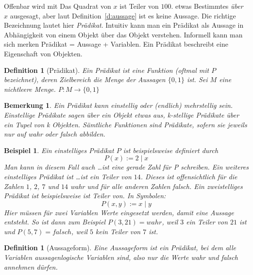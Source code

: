 \documentclass[a4paper]{article}
\newtheorem{beispiel}[satz]{Beispiel}
\newtheorem{bemerkung}[satz]{Bemerkung}
\newtheorem{definition}[satz]{Definition} %
\theoremstyle{nonumberplain}
\begin{document}
Offenbar wird mit \glqq Das Quadrat von $x$ ist Teiler von $100$.\grqq{} etwas Bestimmtes \textit{über} $x$ ausgesagt, aber laut Definition~\ref{d:aussage} ist es keine Aussage. Die richtige Bezeichnung lautet hier \textit{Prädikat}. Intuitiv kann man ein Prädikat als Aussage in Abhängigkeit von einem Objekt über das Objekt verstehen. Informell kann man sich merken \glqq Prädikat = Aussage + Variablen\grqq{}. Ein Prädikat beschreibt eine Eigenschaft von Objekten.

\begin{definition}[Prädikat]
Ein Prädikat ist eine Funktion (oftmal mit $P$ bezeichnet), deren Zielbereich die Menge der Aussagen $\lbrace 0,1 \rbrace$ ist. Sei $M$ eine nichtleere Menge. $P : M \to \lbrace 0,1 \rbrace$
\end{definition}

\begin{bemerkung}
Ein Prädikat kann einstellig oder (endlich) mehrstellig sein. Einstellige Prädikate sagen über ein Objekt etwas aus, k-stellige Prädikate über ein Tupel von k Objekten. Sämtliche Funktionen sind Prädikate, sofern sie jeweils nur auf wahr oder falsch abbilden.
\end{bemerkung}

\begin{beispiel}
Ein einstelliges Prädikat $P$ ist beispielsweise definiert durch
\[
P(x):= 2 \mid x
\]
Man kann in diesem Fall auch \glqq \dots ist eine gerade Zahl\grqq{} für P schreiben. Ein weiteres einstelliges Prädikat ist \glqq \dots ist ein Teiler von $14$\grqq. Dieses ist offensichtlich für die Zahlen $1$, $2$, $7$ und $14$ wahr und für alle anderen Zahlen falsch. Ein zweistelliges Prädikat ist beispielsweise \glqq ist Teiler von\grqq{}. In Symbolen:
\[
P(x,y):= x \mid y
\]
Hier müssen für zwei Variablen Werte eingesetzt werden, damit eine Aussage entsteht. So ist dann zum Beispiel $P(3,21)=wahr$, weil $3$ ein Teiler von $21$ ist und $P(5,7)=falsch$, weil $5$ kein Teiler von $7$ ist.
\end{beispiel}

\begin{definition}[Aussageform]
Eine Aussageform ist ein Prädikat, bei dem alle Variablen aussagenlogische Variablen sind, also nur die Werte wahr und falsch annehmen dürfen.
\end{definition}
\end{document}
